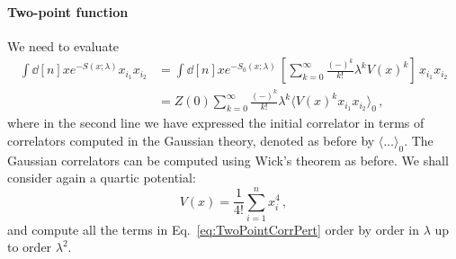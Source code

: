 \documentclass[notes.tex]{subfiles}
\begin{document}
\paragraph{Two-point function}

We need to evaluate
\begin{align}
  \int \dd[n]{x} e^{-S(x;\lambda)} x_{i_1} x_{i_2} &= 
  \int \dd[n]{x} e^{-S_0(x;\lambda)}\, \left[\sum_{k=0}^\infty
  \frac{(-)^k}{k!} \lambda^k V(x)^k \right]\, x_{i_1} x_{i_2} \\
  \label{eq:TwoPointCorrPert}
                                               &=Z(0) \sum_{k=0}^\infty
  \frac{(-)^k}{k!} \lambda^k \langle V(x)^k x_{i_1} x_{i_2}\rangle_0\, ,
\end{align}
where in the second line we have expressed the initial correlator in
terms of correlators computed in the Gaussian theory, denoted as
before by $\langle \ldots \rangle_0$. The Gaussian correlators can be
computed using Wick's theorem as before. We shall consider again a
quartic potential:
\begin{equation}
  V(x) = \frac{1}{4!} \sum_{i=1}^n x_i^4\, ,
\end{equation}
and compute all the terms in Eq.~\ref{eq:TwoPointCorrPert} order by
order in $\lambda$ up to order $\lambda^2$.
\end{document}
